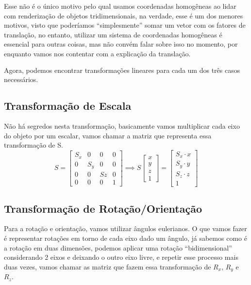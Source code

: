 \documentclass[12pt]{article}
\begin{document}
Esse não é o único motivo pelo qual usamos coordenadas homogêneas ao lidar com renderização de objetos tridimensionais, na verdade, esse é um dos menores motivos, visto que poderíamos ``simplesmente'' somar um vetor com os fatores de translação, no entanto, utilizar um sistema de coordenadas homogêneas é essencial para outras coisas, mas não convém falar sobre isso no momento, por enquanto vamos nos contentar com a explicação da translação.

Agora, podemos encontrar transformações lineares para cada um dos três casos necessários.

\subsection{Transformação de Escala}\label{scale_transform}

Não há segredos nesta transformação, basicamente vamos multiplicar cada eixo do objeto por um escalar, vamos chamar a matriz que representa essa transformação de S.
\[
S =
\begin{bmatrix}
    S_{x} & 0 & 0 & 0 \\
    0 & S_{y} & 0 & 0 \\
    0 & 0 & S{z}  & 0 \\
    0 & 0 & 0     & 1
\end{bmatrix}
\implies
S    
\begin{bmatrix}
    x \\
    y \\
    z \\
    1
\end{bmatrix}
=
\begin{bmatrix}
    S_{x} \cdot x \\
    S_{y} \cdot y \\
    S_{z} \cdot z \\
    1
\end{bmatrix}
\]

\subsection{Transformação de Rotação/Orientação}\label{rotation_transform}

Para a rotação e orientação, vamos utilizar ângulos eulerianos. O que vamos fazer é representar rotações em torno de cada eixo dado um ângulo, já sabemos como é a rotação em duas dimensões, podemos aplicar uma rotação ``bidimensional'' considerando 2 eixos e deixando o outro eixo livre, e repetir esse processo mais duas vezes, vamos chamar as matriz que fazem essa transformação de $R_x$, $R_y$ e $R_z$.
\end{document}
